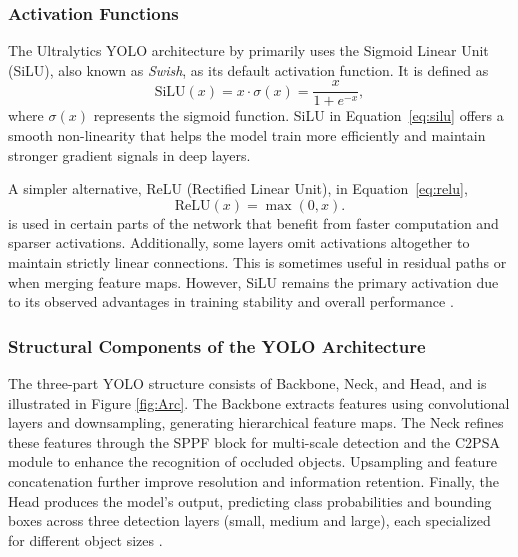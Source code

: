 \documentclass[a4paper,10pt,twocolumn]{article}
\numberwithin{figure}{section}
\numberwithin{table}{section}
\begin{document}
\vspace{0.3cm}
\subsubsection{Activation Functions}
\vspace{0.3cm}

The Ultralytics YOLO architecture by \cite{ultralytics2025} primarily uses the Sigmoid Linear Unit (SiLU), 
also known as \textit{Swish}, as its default activation function. It is defined as
\begin{equation}
\text{SiLU}(x) = x \cdot \sigma(x) = \frac{x}{1 + e^{-x}},
\label{eq:silu}
\end{equation}
where \(\sigma(x)\) represents the sigmoid function. SiLU in Equation~\eqref{eq:silu} offers a smooth non-linearity that helps the model train more efficiently and maintain stronger gradient signals in deep layers.

A simpler alternative, ReLU (Rectified Linear Unit), in Equation~\eqref{eq:relu},
\begin{equation}
\label{eq:relu}
\text{ReLU}(x) = \max(0, x).
\end{equation}
is used in certain parts of the network that benefit from faster computation and sparser activations.
Additionally, some layers omit activations altogether to maintain strictly linear connections.
This is sometimes useful in residual paths or when merging feature maps. 
However, SiLU remains the primary activation due to its observed 
advantages in training stability and overall performance \citep{ultralytics2025}.

\vspace{0.3cm}
\subsubsection{Structural Components of the YOLO Architecture}
\vspace{0.3cm}

The three-part YOLO structure consists of Backbone, Neck, and Head, and is illustrated in Figure \ref{fig:Arc}.
The Backbone extracts features using 
convolutional layers and downsampling, generating hierarchical feature maps.
The Neck refines these features through the SPPF block for multi-scale detection 
and the C2PSA module to enhance the recognition of occluded objects. 
Upsampling and feature concatenation further improve resolution and information 
retention. Finally, the Head produces the model’s output, predicting class probabilities 
and bounding boxes across three detection layers (small, medium and large), 
each specialized for different object sizes \citep{hidayatullah2025yolov8yolo11comprehensivearchitecture}.
\end{document}
